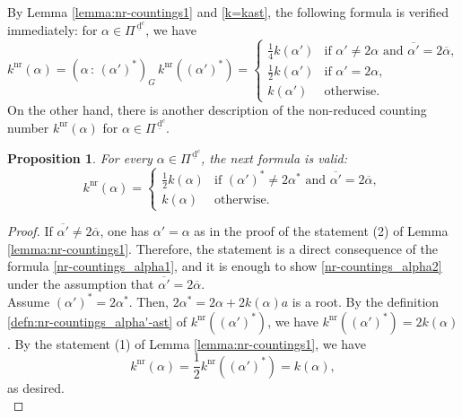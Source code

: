\documentclass[11pt]{amsart}
\newcommand{\nr}{\mathrm{nr}}
\newcommand{\dc}{\,\underline{\mathrm{d}}^c}
\newtheorem{prop}[thm]{Proposition}%
\begin{document}
{By Lemma  \ref{lemma:nr-countings1} and \eqref{k=kast}, 
the following formula is verified immediately: for $\alpha\in \Pi^{\dc}$,  we have
\begin{equation}\label{nr-countings_alpha1}
k^{\mathrm{nr}}(\alpha)=(\alpha\, :\, (\alpha')^\ast)_G\, k^\nr((\alpha')^*)=
\begin{cases}
\frac14 k(\alpha') & \text{if }\alpha'\ne 2\alpha\text{ and }
\overline{\alpha'}=2\overline{\alpha},\\
\frac12 k(\alpha') & \text{if }\alpha'=2\alpha
,\\
k(\alpha') & \text{otherwise}.
\end{cases}
\end{equation}
On the other hand, there is another description of the non-reduced counting
number $k^\nr(\alpha)$ for $\alpha\in \Pi^{\dc}$. 

\begin{prop}\label{prop:nr-countings1}
For every $\alpha\in \Pi^{\dc}$, the next formula is valid{\rm :}
\begin{equation}\label{nr-countings_alpha2}
k^{\mathrm{nr}}(\alpha)=
\begin{cases}
\frac12 k(\alpha) & \text{if } (\alpha')^\ast\ne 2\alpha^\ast
\text{ and }
\overline{\alpha'}= 2\overline{\alpha},\\
k(\alpha) & \text{otherwise}.
\end{cases}
\end{equation}
\end{prop}

\begin{proof}
If $\overline{\alpha'}\ne 2\overline{\alpha}$, one has $\alpha'=\alpha$ as in the 
proof of the statement (2) of Lemma \ref{lemma:nr-countings1}.
Therefore, the statement is a direct consequence of the formula 
\eqref{nr-countings_alpha1}, and it is
enough to show \eqref{nr-countings_alpha2} under the assumption that 
$\overline{\alpha'}= 2\overline{\alpha}$.\\
 
Assume $(\alpha')^*=2\alpha^*$. Then, $2\alpha^*=2\alpha+2k(\alpha)a$
is a root. By the definition \eqref{defn:nr-countings_alpha'-ast}
of $k^{\nr}((\alpha')^\ast)$, we have
$k^{\nr}((\alpha')^\ast)=2k(\alpha)$.
By the statement (1) of Lemma \ref{lemma:nr-countings1}, 
we have 
\begin{equation*}
k^{\nr}(\alpha)=\dfrac12 k^{\nr}((\alpha')^\ast)=k(\alpha),
\end{equation*}
as desired. \\


\end{proof}}
\end{document}
